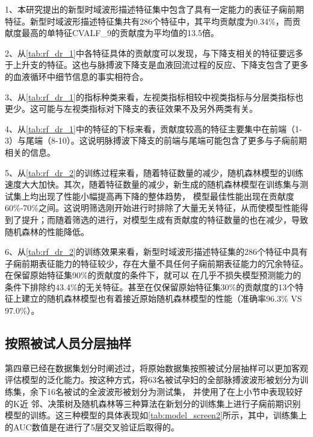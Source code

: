1、本研究提出的新型时域波形描述特征集中包含了具有一定能力的表征子痫前期特征。新型时域波形描述特征集共有286个特征中，其平均贡献度为0.34\%，而贡献度最高的单特征CVALF\_9的贡献度为平均值的13.5倍。

2、从\autoref{tab:rf_dr_1}中各特征具体的贡献度可以发现，与下降支相关的特征要远多于上升支的特征。这也与脉搏波下降支是血液回流过程的反应、下降支包含了更多的血液循环中细节信息的事实相符合。

3、从\autoref{tab:rf_dr_1}的指标种类来看，左视类指标相较中视类指标与分层类指标也更少。这可能与左视类指标对下降支的表征效果不及另外两类有关。

4、从\autoref{tab:rf_dr_1}中的特征的下标来看，贡献度较高的特征主要集中在前端（1-3）与尾端（8-10）。这说明脉搏波下降支的前端与尾端可能包含了更多与子痫前期相关的信息。

5、从\autoref{tab:rf_dr_2}的训练过程来看，随着特征数量的减少，随机森林模型的训练速度大大加快。其次，随着特征数量的减少，新生成的随机森林模型在训练集与测试集上均出现了性能小幅提高再下降的整体趋势，
模型最佳性能出现在贡献度60\%-70\%之间。这说明筛选刚开始进行时排除了大量无关特征，从而使模型性能得到了提升；而随着筛选的进行，对模型生成有贡献度的特征数量的也在减少，导致随机森林的性能降低。

6、从\autoref{tab:rf_dr_2}的训练效果来看，新型时域波形描述特征集的286个特征中具有子痫前期表征能力的特征较少，存在大量不具任何子痫前期表征能力的冗余特征。在保留原始特征集90\%的贡献度的条件下，就可以
在几乎不损失模型预测能力的条件下排除约43.4\%的无关特征。甚至在仅保留原始特征集30\%的贡献度的13个特征上建立的随机森林模型也有着接近原始随机森林模型的性能（准确率96.3\% VS 97.0\%）。

\subsection{按照被试人员分层抽样}

第四章已经在数据集划分时阐述过，将原始数据集按照被试分层抽样可以更加客观评估模型的泛化能力。按这种方式，将63名被试孕妇的全部脉搏波波形被划分为训练集，余下16名被试的全波波形被划分为测试集，
并使用了在上小节中表现较好的K近
邻、决策树及随机森林等三种算法在新划分的训练集上进行子痫前期识别模型的训练。这三种模型的具体表现如\autoref{tab:model_screen2}所示，其中，训练集上的AUC数值是在进行了5层交叉验证后取得的。

